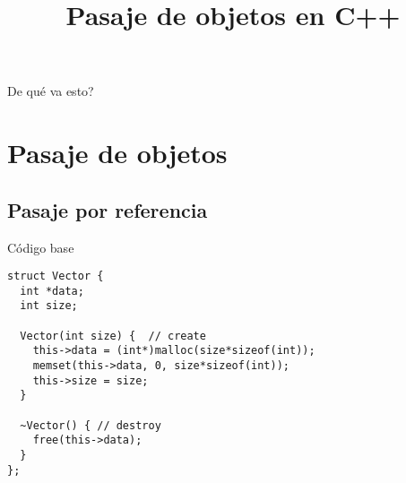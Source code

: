 


\title%
{Pasaje de objetos en C++}

\subject{Pasaje de objetos en C++}





\begin{frame}
   \titlepage
\end{frame}

\begin{frame}{De qu\'e va esto?}
   \tableofcontents
\end{frame}

\section{Pasaje de objetos}
\subsection{Pasaje por referencia}
\begin{frame}[fragile]{C\'odigo base}
        \begin{lstlisting}[style=normal,firstnumber=1]
struct Vector {
  int *data;
  int size;

  Vector(int size) {  // create
    this->data = (int*)malloc(size*sizeof(int));
    memset(this->data, 0, size*sizeof(int));
    this->size = size;
  }

  ~Vector() { // destroy
    free(this->data);
  }
};
        \end{lstlisting}
\end{frame}

